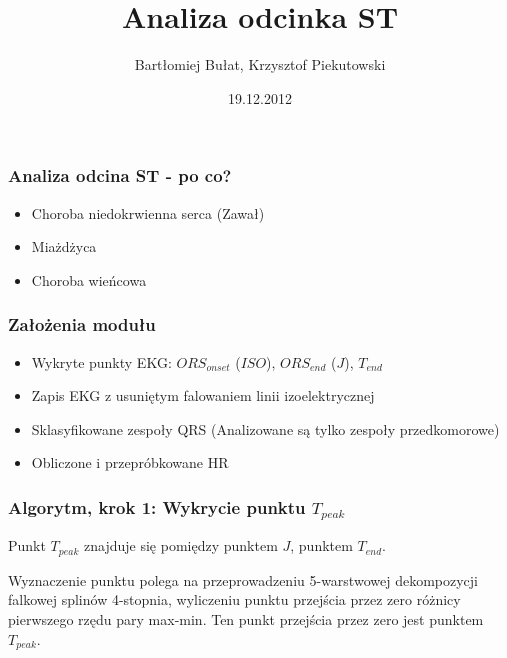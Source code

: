 \documentclass{beamer}
\title[ST Interval]{Analiza odcinka ST}
\author[B. Bułat, K. Piekutowski]{Bartłomiej Bułat, Krzysztof Piekutowski}
\date[2012]{19.12.2012}
\institute[AGH]
{Wydział EAIiIB\\ 
Katedra Automatyki
}
\begin{document}
{
 \begin{frame}
   \titlepage
 \end{frame}
}


\begin{frame}
  \frametitle{Analiza odcina ST - po co?}

  \begin{itemize}
    \item Choroba niedokrwienna serca (Zawał)
    \item Miażdżyca
    \item Choroba wieńcowa
  \end{itemize}

\end{frame}

\begin{frame}
  \frametitle{Założenia modułu}
  \begin{itemize}
    \item Wykryte punkty EKG: $ORS_{onset}$ ($ISO$), $ORS_{end}$
      ($J$), $T_{end}$
    \item Zapis EKG z usuniętym falowaniem linii izoelektrycznej
    \item Sklasyfikowane zespoły QRS (Analizowane są tylko zespoły
      przedkomorowe)
    \item Obliczone i przepróbkowane HR
  \end{itemize}
\end{frame}

\begin{frame}
  \frametitle{Algorytm, krok 1: Wykrycie punktu $T_{peak}$}

  Punkt $T_{peak}$ znajduje się pomiędzy punktem $J$, punktem $T_{end}$.

  

  Wyznaczenie punktu polega na przeprowadzeniu 5-warstwowej dekompozycji
  falkowej splinów 4-stopnia, wyliczeniu punktu przejścia przez zero różnicy
  pierwszego rzędu pary max-min. Ten punkt przejścia przez zero jest punktem
  $T_{peak}$.

\end{frame}
\end{document}
